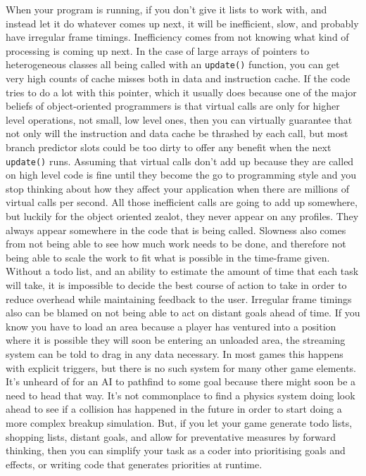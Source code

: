When your program is running, if you don't give it lists to work with, and
instead let it do whatever comes up next, it will be inefficient, slow, and
probably have irregular frame timings. Inefficiency comes from not knowing what
kind of processing is coming up next. In the case of large arrays of pointers
to heterogeneous classes all being called with an \texttt{update()} function,
you can get very high counts of cache misses both in data and instruction
cache. If the code tries to do a lot with this pointer, which it usually does
because one of the major beliefs of object-oriented programmers is that virtual
calls are only for higher level operations, not small, low level ones, then you
can virtually guarantee that not only will the instruction and data cache be
thrashed by each call, but most branch predictor slots could be too dirty to
offer any benefit when the next \texttt{update()} runs. Assuming that virtual
calls don't add up because they are called on high level code is fine until
they become the go to programming style and you stop thinking about how they
affect your application when there are millions of virtual calls per second.
All those inefficient calls are going to add up somewhere, but luckily for the
object oriented zealot, they never appear on any profiles. They always appear
somewhere in the code that is being called.  Slowness also comes from not being
able to see how much work needs to be done, and therefore not being able to
scale the work to fit what is possible in the time-frame given. Without a todo
list, and an ability to estimate the amount of time that each task will take,
it is impossible to decide the best course of action to take in order to reduce
overhead while maintaining feedback to the user. Irregular frame timings also
can be blamed on not being able to act on distant goals ahead of time. If you
know you have to load an area because a player has ventured into a position
where it is possible they will soon be entering an unloaded area, the streaming
system can be told to drag in any data necessary. In most games this happens
with explicit triggers, but there is no such system for many other game
elements. It's unheard of for an AI to pathfind to some goal because there
might soon be a need to head that way. It's not commonplace to find a physics
system doing look ahead to see if a collision has happened in the future in
order to start doing a more complex breakup simulation. But, if you let your
game generate todo lists, shopping lists, distant goals, and allow for
preventative measures by forward thinking, then you can simplify your task as a
coder into prioritising goals and effects, or writing code that generates
priorities at runtime.

